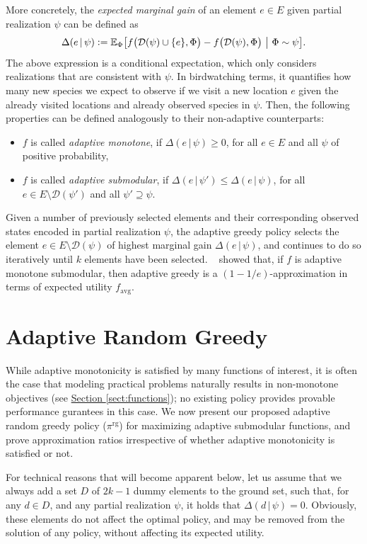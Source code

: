 \documentclass{article}
\newcommand{\sectref}[1]{\hyperref[#1]{Section \ref*{#1}}}
\newcommand{\defeq}{\vcentcolon=}
\newcommand{\mmid}{\,\vert\,}
\newcommand{\D}[2]{\Delta(#1\mmid#2)}
\newcommand{\pig}{\pi^{\textrm{rg}}}
\newcommand{\favg}{f_{\mathrm{avg}}}
\newcommand{\dom}{\mathcal{D}}
\newcommand{\citet}[1]{\citeauthor{#1}~\shortcite{#1}}
\begin{document}
More concretely, the \emph{expected marginal gain} of an element $e \in E$ given partial realization $\psi$ can be defined as
\begin{align*}
  \D{e}{\psi} \defeq \E[\Phi]{f\big(\mathcal{D}(\psi) \cup \{e\}, \Phi\big) - f\big(\dom(\psi), \Phi\big)}[\Phi \sim \psi].
\end{align*}
The above expression is a conditional expectation, which only considers realizations that are consistent with $\psi$.
In birdwatching terms, it quantifies how many new species we expect to observe if we visit a new location $e$ given the already visited locations and already observed species in $\psi$.
Then, the following properties can be defined analogously to their non-adaptive counterparts:
\begin{itemize}
\item $f$ is called \emph{adaptive monotone}, if $\D{e}{\psi} \geq 0$, for all $e \in E$ and all $\psi$ of positive probability,
\item $f$ is called \emph{adaptive submodular}, if $\D{e}{\psi'} \leq \D{e}{\psi}$, for all $e \in E \setminus \dom(\psi')$ and all $\psi' \supseteq \psi$.
\end{itemize}

Given a number of previously selected elements and their corresponding observed states encoded in partial realization $\psi$, the adaptive greedy policy selects the element $e \in E \setminus \dom(\psi)$ of highest marginal gain $\D{e}{\psi}$, and continues to do so iteratively until $k$ elements have been selected.
\citet{golovin11} showed that, if $f$ is adaptive monotone submodular, then adaptive greedy is a $(1-1/e)$-approximation in terms of expected utility $\favg$.

\section{Adaptive Random Greedy}
While adaptive monotonicity is satisfied by many functions of interest, it is often the case that modeling practical problems naturally results in non-monotone objectives (see \sectref{sect:functions}); no existing policy provides provable performance gurantees in this case.
We now present our proposed adaptive random greedy policy ($\pig$) for maximizing adaptive submodular functions, and prove approximation ratios irrespective of whether adaptive monotonicity is satisfied or not.

For technical reasons that will become apparent below, let us assume that we always add a set $D$ of $2k - 1$ dummy elements to the ground set, such that, for any $d \in D$, and any partial realization $\psi$, it holds that $\D{d}{\psi} = 0$.
Obviously, these elements do not affect the optimal policy, and may be removed from the solution of any policy, without affecting its expected utility.
\end{document}
